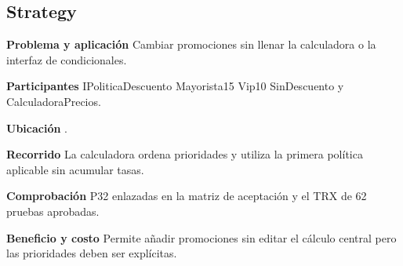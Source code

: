 \noindent\begin{minipage}{\linewidth}
\subsection{Strategy}
\textbf{Problema y aplicación} Cambiar promociones sin llenar la calculadora o la interfaz de condicionales.

\textbf{Participantes} IPoliticaDescuento Mayorista15 Vip10 SinDescuento y CalculadoraPrecios.

\textbf{Ubicación} \href{https://github.com/Alan77-bot/LogiMarket360Alan/blob/68bda51063441415524ede51bdf61649ee9b4973/LogiMarket.Domain/Promociones/CalculadoraPrecios.cs#L5}{}.

\textbf{Recorrido} La calculadora ordena prioridades y utiliza la primera política aplicable sin acumular tasas.


\textbf{Comprobación} P32 enlazadas en la matriz de aceptación y el TRX de 62 pruebas aprobadas.

\textbf{Beneficio y costo} Permite añadir promociones sin editar el cálculo central pero las prioridades deben ser explícitas.

\end{minipage}\par\smallskip
